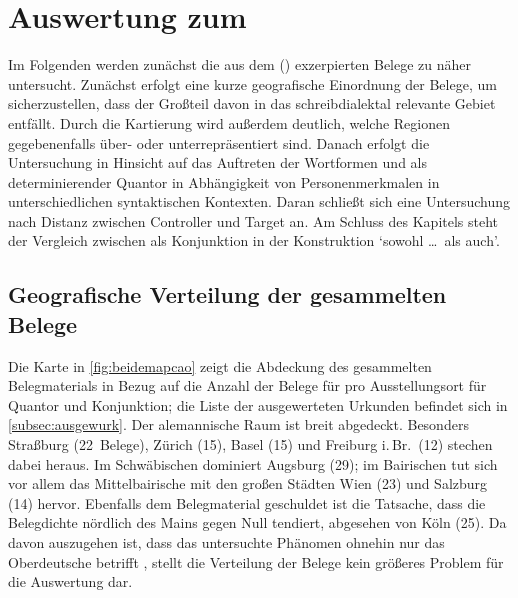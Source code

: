 \chapter{Auswertung zum }
\label{ch:caoanalyse}

Im Folgenden werden zunächst die aus dem  (\CAO{})
exzerpierten Belege zu  näher untersucht. Zunächst erfolgt eine
kurze geografische Einordnung der Belege, um sicherzustellen, dass der Großteil
davon in das schreib\-dialektal relevante Gebiet entfällt. Durch die Kartierung
wird außerdem deutlich, welche Regionen gegebenenfalls über- oder
unter\-repräsentiert sind. Danach erfolgt die Untersuchung in Hinsicht auf das
Auftreten der Wortformen  und  als determinierender
Quantor in Abhängigkeit von Personenmerkmalen in unterschiedlichen
syntaktischen Kontexten. Daran schließt sich eine Untersuchung nach Distanz
zwischen Controller und Target an. Am Schluss des Kapitels steht der Vergleich
zwischen  als Konjunk\-tion in der Konstruktion
 `sowohl \dots\ als auch'.

\section{Geografische Verteilung der gesammelten Belege}

Die Karte in \cref{fig:beidemapcao} zeigt die Abdeckung des gesammelten
Belegmaterials in Bezug auf die Anzahl der Belege für  pro
Ausstellungsort für Quantor und Konjunktion; die Liste der ausgewerteten
Urkunden befindet sich in \cref{subsec:ausgewurk}. Der alemannische Raum ist
breit abgedeckt. Besonders Straßburg (22~Belege), Zürich (15), Basel (15) und
Freiburg i.\,Br.\ (12) stechen dabei heraus. Im Schwäbischen dominiert Augsburg
(29); im Bairischen tut sich vor allem das Mittelbairische mit den großen
Städten Wien (23) und Salzburg (14) hervor. Ebenfalls dem Belegmaterial
geschuldet ist die Tatsache, dass die Belegdichte nördlich des Mains gegen Null
tendiert, abgesehen von Köln (25). Da davon auszugehen ist, dass das
untersuchte Phänomen ohnehin nur das Oberdeutsche betrifft
\autocite[181--184]{ksw2}, stellt die Verteilung der Belege kein größeres
Problem für die Auswertung dar.

